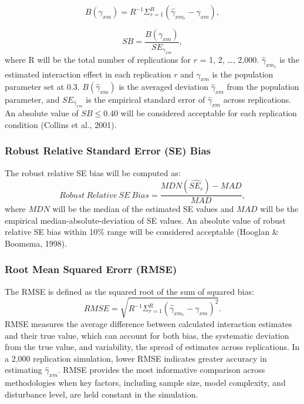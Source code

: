 \documentclass[
  man]{apa7}
\begin{document}
\begin{equation}
B(\gamma_{xm}) = R^{-1}\Sigma^{R}_{r = 1}(\hat{\gamma}_{xm_{r}} - \gamma_{xm}),
\end{equation}

\begin{equation}
SB = \frac{B(\gamma_{xm})}{SE_{\gamma_{xm}}},
\end{equation}
where R will be the total number of replications for \(r\) = 1, 2, \ldots, 2,000. \(\hat{\gamma}_{xm_{r}}\) is the estimated interaction effect in each replication \(r\) and \(\gamma_{xm}\) is the population parameter set at 0.3. \(B(\hat{\gamma}_{xm})\) is the averaged deviation \(\hat{\gamma}_{xm}\) from the population parameter, and \(SE_{\hat{\gamma}_{xm}}\) is the empirical standard error of \(\hat{\gamma}_{xm}\) across replications. An absolute value of \(SB \le 0.40\) will be considered acceptable for each replication condition (Collins et al., 2001).

\hypertarget{robust-relative-standard-error-se-bias}{%
\subsubsection{Robust Relative Standard Error (SE) Bias}\label{robust-relative-standard-error-se-bias}}

The robust relative SE bias will be computed as:
\begin{equation}
Robust\ Relative\ SE\ Bias = \frac{MDN(\widehat{SE_{r}}) - MAD}{MAD},
\end{equation}
where \(MDN\) will be the median of the estimated SE values and \(MAD\) will be the empirical median-absolute-deviation of SE values. An absolute value of robust relative SE bias within 10\% range will be considered acceptable (Hooglan \& Boomsma, 1998).

\hypertarget{root-mean-squared-erorr-rmse}{%
\subsubsection{Root Mean Squared Erorr (RMSE)}\label{root-mean-squared-erorr-rmse}}

The RMSE is defined as the squared root of the sum of squared bias:
\begin{equation}
RMSE = \sqrt{R^{-1}\Sigma^{R}_{r = 1}(\hat{\gamma}_{xm_{r}} - \gamma_{xm})^2}.
\end{equation}
RMSE measures the average difference between calculated interaction estimates and their true value, which can account for both bias, the systematic deviation from the true value, and variability, the spread of estimates across replications. In a 2,000 replication simulation, lower RMSE indicates greater accuracy in estimating \(\hat{\gamma}_{xm}\). RMSE provides the most informative comparison across methodologies when key factors, including sample size, model complexity, and disturbance level, are held constant in the simulation.
\end{document}
